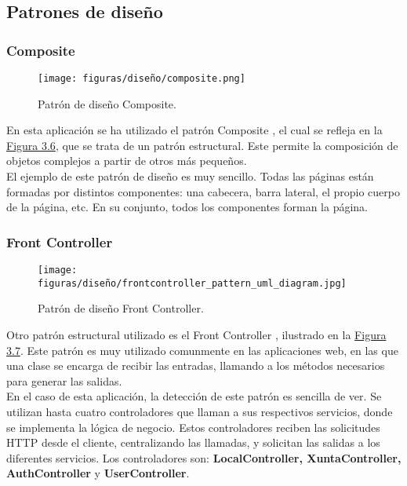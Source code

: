 \subsection{Patrones de diseño}

\subsubsection{Composite}

\begin{figure}[H]
\centerline{\texttt{[image: figuras/diseño/composite.png]}}
\caption{Patrón de diseño Composite.}
\label{enlaceComposite}
\end{figure}

En esta aplicación se ha utilizado el patrón Composite \cite{composite}, el cual se refleja en la \hyperref[enlaceComposite]{Figura 3.6}, que se trata de un patrón estructural. Este permite la composición de objetos complejos a partir de otros más pequeños. 
\\

El ejemplo de este patrón de diseño es muy sencillo. Todas las páginas están formadas por distintos componentes: una cabecera, barra lateral, el propio cuerpo de la página, etc. En su conjunto, todos los componentes forman la página.


\subsubsection{Front Controller}

\begin{figure}[H]
\centerline{\texttt{[image: figuras/diseño/frontcontroller\_pattern\_uml\_diagram.jpg]}}
\caption{Patrón de diseño Front Controller.}
\label{enlaceFrontController}
\end{figure}

Otro patrón estructural utilizado es el Front Controller \cite{frontcontroller}, ilustrado en la \hyperref[enlaceFrontController]{Figura 3.7}. Este patrón es muy utilizado comunmente en las aplicaciones web, en las que una clase se encarga de recibir las entradas, llamando a los métodos necesarios para generar las salidas.
\\

En el caso de esta aplicación, la detección de este patrón es sencilla de ver. Se utilizan hasta cuatro controladores que llaman a sus respectivos servicios, donde se implementa la lógica de negocio. Estos controladores reciben las solicitudes HTTP desde el cliente, centralizando las llamadas, y solicitan las salidas a los diferentes servicios. Los controladores son: {\bf LocalController, XuntaController, AuthController} y {\bf UserController}.


